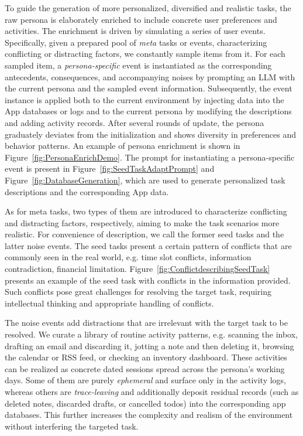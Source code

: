 \documentclass{article}
\begin{document}
To guide the generation of more personalized, diversified and realistic tasks, the raw persona is elaborately enriched to include concrete user preferences and activities. The enrichment is driven by simulating a series of user events. Specifically, given a prepared pool of \textit{meta} tasks or events, characterizing conflicting or distracting factors, we constantly sample items from it. For each sampled item, a \textit{persona-specific} event is instantiated as the corresponding antecedents, consequences, and accompanying noises by prompting an LLM with the current persona and the sampled event information. Subsequently, the event instance is applied both to the current environment by injecting data into the App databases or logs and to the current persona by modifying the descriptions and adding activity records. After several rounds of update, the persona graduately deviates from the initialization and shows diversity in preferences and behavior patterns. An example of persona enrichment is shown in Figure~\ref{fig:PersonaEnrichDemo}. The prompt for instantiating a persona-specific event is present in Figure~\ref{fig:SeedTaskAdaptPrompt} and Figure~\ref{fig:DatabaseGeneration}, which are used to generate personalized task descriptions and the corresponding App data.

As for meta tasks, two types of them are introduced to characterize conflicting and distracting factors, respectively, aiming to make the task scenarios more realistic. For convenience of description, we call the former seed tasks and the latter noise events. The seed tasks present a certain pattern of conflicts that are commonly seen in the real world, e.g. time slot conflicts, information contradiction, financial limitation. Figure~\ref{fig:ConflictdescribingSeedTask} presents an example of the seed task with conflicts in the information provided. Such conflicts pose great challenges for resolving the target task, requiring intellectual thinking and appropriate handling of conflicts.

The noise events add distractions that are irrelevant with the target task to be resolved. We curate a library of routine activity patterns, e.g. scanning the inbox, drafting an email and discarding it, jotting a note and then deleting it, browsing the calendar or RSS feed, or checking an inventory dashboard. These activities can be realized as concrete dated sessions spread across the persona's working days. Some of them are purely \emph{ephemeral} and surface only in the activity logs, whereas others are \emph{trace-leaving} and additionally deposit residual records (such as deleted notes, discarded drafts, or cancelled todos) into the corresponding app databases. This further increases the complexity and realism of the environment without interfering the targeted task.
\end{document}
